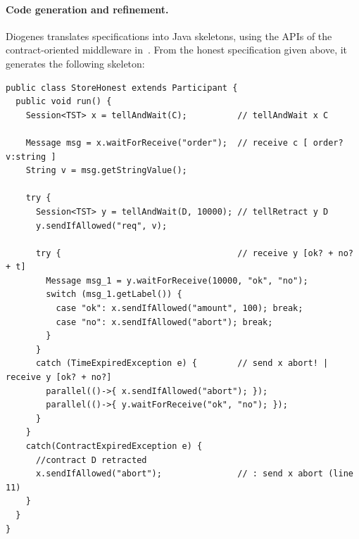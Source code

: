 \paragraph{Code generation and refinement.}
Diogenes translates \coco specifications into Java skeletons,
using the APIs of the contract-oriented middleware in~\cite{CO2middleware}.
From the honest specification given above,
it generates the following skeleton:
\begin{mdframed}
  \begin{verbatim}
public class StoreHonest extends Participant { 
  public void run() {
    Session<TST> x = tellAndWait(C);          // tellAndWait x C
    
    Message msg = x.waitForReceive("order");  // receive c [ order? v:string ]
    String v = msg.getStringValue();
    
    try {
      Session<TST> y = tellAndWait(D, 10000); // tellRetract y D
      y.sendIfAllowed("req", v);
      
      try {                                   // receive y [ok? + no? + t]
        Message msg_1 = y.waitForReceive(10000, "ok", "no");
        switch (msg_1.getLabel()) {                    
          case "ok": x.sendIfAllowed("amount", 100); break;
          case "no": x.sendIfAllowed("abort"); break;                    
        }
      }
      catch (TimeExpiredException e) {        // send x abort! | receive y [ok? + no?] 
        parallel(()->{ x.sendIfAllowed("abort"); });
        parallel(()->{ y.waitForReceive("ok", "no"); });
      }            
    }
    catch(ContractExpiredException e) {
      //contract D retracted
      x.sendIfAllowed("abort");               // : send x abort (line 11)
    } 
  }
}
  \end{verbatim}
\end{mdframed}

